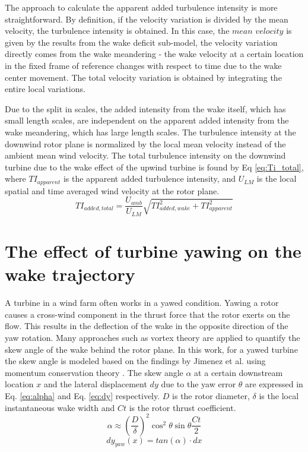 \documentclass{umthesis}
\begin{document}
The approach to calculate the apparent added turbulence intensity is more straightforward. By definition, if the velocity variation is divided by the mean velocity, the turbulence intensity is obtained. In this case, the $mean$ $velocity$ is given by the results from the wake deficit sub-model, the velocity variation directly comes from the wake meandering - the wake velocity at a certain location in the fixed frame of reference changes with respect to time due to the wake center movement. The total velocity variation is obtained by integrating the entire local variations.

Due to the split in scales, the added intensity from the wake itself, which has small length scales, are independent on the apparent added intensity from the wake meandering, which has large length scales. The turbulence intensity at the downwind rotor plane is normalized by the local mean velocity instead of the ambient mean wind velocity. The total turbulence intensity on the downwind turbine due to the wake effect of the upwind turbine is found by Eq \ref{eq:Ti_total}, where $TI_{apparent}$ is the apparent added turbulence intensity, and $U_{LM}$ is the local spatial and time averaged wind velocity at the rotor plane.
\begin{equation}\label{eq:Ti_total}
  TI_{added,total}=\frac{U_{amb}}{U_{LM}}\sqrt{TI_{added,wake}^2+TI_{apparent}^2}
\end{equation}

\section{The effect of turbine yawing on the wake trajectory}\label{sec:turbine_yaw}
A turbine in a wind farm often works in a yawed condition. Yawing a rotor causes a cross-wind component in the thrust force that the rotor exerts on the flow. This results in the deflection of the wake in the opposite direction of the yaw rotation. Many approaches such as vortex theory are applied to quantify the skew angle of the wake behind the rotor plane. In this work, for a yawed turbine the skew angle is modeled based on the findings by Jimenez et al. using momentum conservation theory \cite{Jiménez}. The skew angle $\alpha$ at a certain downstream location $x$ and the lateral displacement $dy$ due to the yaw error $\theta$ are expressed in Eq. \ref{eq:alpha} and Eq. \ref{eq:dy} respectively. $D$ is the rotor diameter, $\delta$ is the local instantaneous wake width and $Ct$ is the rotor thrust coefficient.
\begin{equation}\label{eq:alpha}
  \alpha\approx(\frac{D}{\delta})^2\cos ^2\theta\sin\theta\frac{Ct}{2}
\end{equation}
\begin{equation}\label{eq:dy}
  dy_{yaw}(x)=tan(\alpha)\cdot dx
\end{equation}
\end{document}
